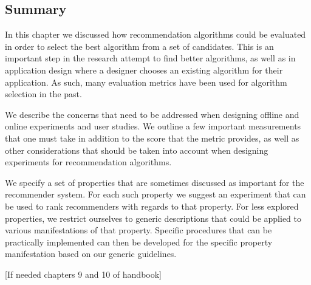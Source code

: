 \subsection{Summary}

In this chapter we discussed how recommendation algorithms could be evaluated in order to select the best algorithm from a set of candidates. This is an important step in the research attempt to find better algorithms, as well as in application design where a designer chooses an existing algorithm for their application. As such, many evaluation metrics have been used for algorithm selection in the past.

We describe the concerns that need to be addressed when designing offline and online experiments and user studies. We outline a few important measurements that one must take in addition to the score that the metric provides, as well as other considerations that should be taken into account when designing experiments for recommendation algorithms.

We specify a set of properties that are sometimes discussed as important for the recommender system. For each such property we suggest an experiment that can be used to rank recommenders with regards to that property. For less explored properties, we restrict ourselves to generic descriptions that could be applied to various manifestations of that property. Specific procedures that can be practically implemented can then be developed for the specific property manifestation based on our generic guidelines.

[If needed chapters 9 and 10 of handbook]
